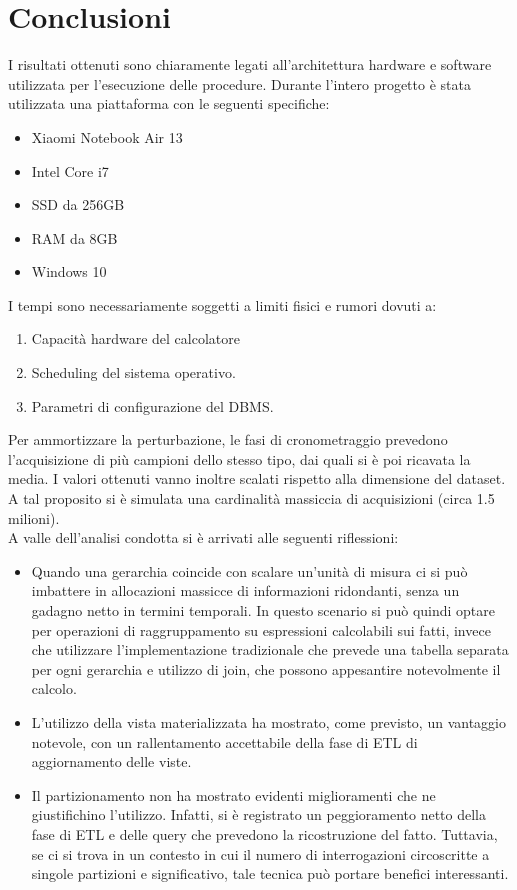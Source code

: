 \chapter{Conclusioni}
I risultati ottenuti sono chiaramente legati all'architettura hardware e software utilizzata per l'esecuzione delle procedure. Durante l'intero progetto è stata utilizzata una piattaforma con le seguenti specifiche:
\begin{itemize}
	\item Xiaomi Notebook Air 13
	\item Intel Core i7
	\item SSD da 256GB
	\item RAM da 8GB
	\item Windows 10
\end{itemize}
I tempi sono necessariamente soggetti a limiti fisici e rumori dovuti a:
\begin{enumerate}
	\item Capacità hardware del calcolatore
	\item Scheduling del sistema operativo.
	\item Parametri di configurazione del DBMS.
\end{enumerate}
Per ammortizzare la perturbazione, le fasi di cronometraggio prevedono l'acquisizione di più campioni dello stesso tipo, dai quali si è poi ricavata la media. I valori ottenuti vanno inoltre scalati rispetto alla dimensione del dataset. A tal proposito si è simulata una cardinalità massiccia di acquisizioni (circa 1.5 milioni).\\
A valle dell’analisi condotta si è arrivati alle seguenti riflessioni:

\begin{itemize}
	\item Quando una gerarchia coincide con scalare un'unità di misura ci si può imbattere in allocazioni massicce di informazioni ridondanti, senza un gadagno netto in termini temporali. In questo scenario si può quindi optare per operazioni di raggruppamento su espressioni	calcolabili sui fatti, invece che utilizzare l’implementazione tradizionale che prevede una tabella separata per ogni gerarchia e utilizzo di join, che possono appesantire notevolmente il calcolo.
	\item L’utilizzo della vista materializzata ha mostrato, come previsto, un vantaggio notevole, con un rallentamento accettabile della fase di ETL di aggiornamento delle viste.
	\item Il partizionamento non ha mostrato evidenti miglioramenti che ne giustifichino l’utilizzo. Infatti, si è registrato un peggioramento netto della fase di ETL e delle query che prevedono la ricostruzione del fatto. Tuttavia, se ci si trova in un contesto in cui il numero di interrogazioni circoscritte a singole partizioni e significativo, tale tecnica può portare benefici interessanti.
\end{itemize}